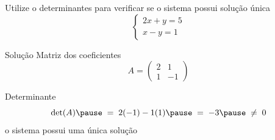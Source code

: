 \begin{question}
  Utilize o determinantes para verificar se o sistema possui solução única
  \[
    \begin{cases}
      2x + y = 5 \\
       x - y = 1
    \end{cases}
  \]
\end{question}

\begin{resolution}{Solução}
  Matriz dos coeficientes
  \[
    A =
    \begin{pmatrix}
      2 & 1  \\
      1 & -1
    \end{pmatrix}
  \]

  \pause
  Determinante
  \[
    \det(A)
    \pause
    \;=\; 2(-1) - 1(1)
    \pause
    \;=\; -3
    \pause
    \;\neq\; 0
  \]
  \pause
  o sistema possui uma única solução
\end{resolution}

\endinput

